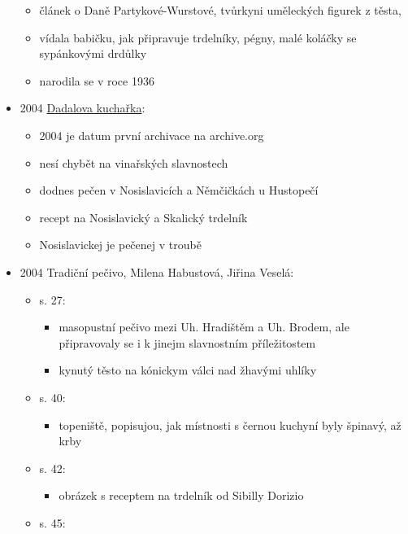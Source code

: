 \begin{itemize}
  \begin{itemize}
  \tightlist
  \item
    článek o Daně Partykové-Wurstové, tvůrkyni uměleckých figurek z
    těsta,
  \item
    vídala babičku, jak připravuje trdelníky, pégny, malé koláčky se
    sypánkovými drdůlky
  \item
    narodila se v roce 1936
  \end{itemize}
\item
  2004
  \href{https://dadala.hyperlinx.cz/hypsladkuch/ost/ostr0025.html}{Dadalova
  kuchařka}:

  \begin{itemize}
  \tightlist
  \item
    2004 je datum první archivace na archive.org
  \item
    nesí chybět na vinařských slavnostech
  \item
    dodnes pečen v Nosislavicích a Němčičkách u Hustopečí
  \item
    recept na Nosislavický a Skalický trdelník
  \item
    Nosislavickej je pečenej v troubě
  \end{itemize}
\item
  2004 Tradiční pečivo, Milena Habustová, Jiřina Veselá:

  \begin{itemize}
  \tightlist
  \item
    s. 27:

    \begin{itemize}
    \tightlist
    \item
      masopustní pečivo mezi Uh. Hradištěm a Uh. Brodem, ale
      připravovaly se i k jinejm slavnostním příležitostem
    \item
      kynutý těsto na kónickym válci nad žhavými uhlíky
    \end{itemize}
  \item
    s. 40:

    \begin{itemize}
    \tightlist
    \item
      topeniště, popisujou, jak místnosti s černou kuchyní byly špinavý,
      až krby
    \end{itemize}
  \item
    s. 42:

    \begin{itemize}
    \tightlist
    \item
      obrázek s receptem na trdelník od Sibilly Dorizio
    \end{itemize}
  \item
    s. 45:


\end{itemize}
\end{itemize}
